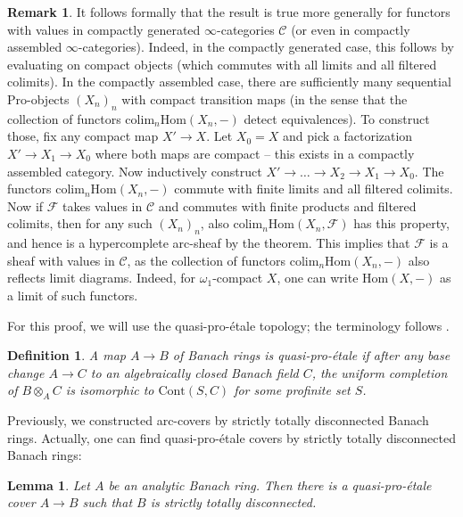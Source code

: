 \documentclass[11pt]{amsart}
\numberwithin{equation}{section}
\numberwithin{theorem}{section}
\newtheorem{lemma}[theorem]{Lemma}
\newtheorem{definition}[theorem]{Definition}
\theoremstyle{definition}
\newtheorem{remark}[theorem]{Remark}
\begin{document}
\begin{remark} It follows formally that the result is true more generally for functors with values in compactly generated $\infty$-categories $\mathcal C$ (or even in compactly assembled $\infty$-categories). Indeed, in the compactly generated case, this follows by evaluating on compact objects (which commutes with all limits and all filtered colimits). In the compactly assembled case, there are sufficiently many sequential Pro-objects $(X_n)_n$ with compact transition maps (in the sense that the collection of functors $\mathrm{colim}_n \mathrm{Hom}(X_n,-)$ detect equivalences). To construct those, fix any compact map $X'\to X$. Let $X_0=X$ and pick a factorization $X'\to X_1\to X_0$ where both maps are compact -- this exists in a compactly assembled category. Now inductively construct $X'\to \ldots\to X_2\to X_1\to X_0$. The functors $\mathrm{colim}_n \mathrm{Hom}(X_n,-)$ commute with finite limits and all filtered colimits. Now if $\mathcal F$ takes values in $\mathcal C$ and commutes with finite products and filtered colimits, then for any such $(X_n)_n$, also $\mathrm{colim}_n \mathrm{Hom}(X_n,\mathcal F)$ has this property, and hence is a hypercomplete arc-sheaf by the theorem. This implies that $\mathcal F$ is a sheaf with values in $\mathcal C$, as the collection of functors $\mathrm{colim}_n \mathrm{Hom}(X_n,-)$ also reflects limit diagrams. Indeed, for $\omega_1$-compact $X$, one can write $\mathrm{Hom}(X,-)$ as a limit of such functors.
\end{remark}

For this proof, we will use the quasi-pro-\'etale topology; the terminology follows \cite[Definition 10.1, Lemma 7.19]{ECoD}.

\begin{definition}\label{def:quasiproetale} A map $A\to B$ of Banach rings is quasi-pro-\'etale if after any base change $A\to C$ to an algebraically closed Banach field $C$, the uniform completion of $B\otimes_A C$ is isomorphic to $\mathrm{Cont}(S,C)$ for some profinite set $S$.
\end{definition}

Previously, we constructed arc-covers by strictly totally disconnected Banach rings. Actually, one can find quasi-pro-\'etale covers by strictly totally disconnected Banach rings:

\begin{lemma}\label{lem:quasiproetalecover} Let $A$ be an analytic Banach ring. Then there is a quasi-pro-\'etale cover $A\to B$ such that $B$ is strictly totally disconnected.
\end{lemma}
\end{document}
